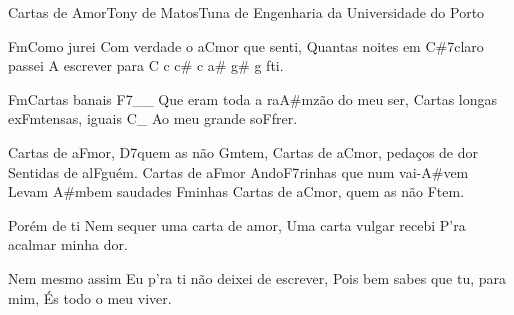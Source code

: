 \begin{musica}{Cartas de Amor}{Tony de Matos}{Tuna de Engenharia da Universidade do Porto}


\ac{Fm}{Co}mo jurei
Com verdade o a\ac{C}{mor} que senti,
Quantas noites em \ac{C#7}{cla}ro passei
A escrever para \ac{C c c# c a# g# g f}{ti}.

\ac{Fm}{Car}tas banais \ac{F7}{}__
Que eram toda a ra\ac{A#m}{zão} do meu ser,
Cartas longas ex\ac{Fm}{ten}sas, iguais
\ac{C}{}_ Ao meu grande so\ac{F}{frer}.

Cartas de a\ac{F}{mor}, \ac{D7}{quem} as não \ac{Gm}{tem},
Cartas de a\ac{C}{mor}, pedaços de dor
Sentidas de al\ac{F}{guém}.
Cartas de a\ac{F}{mor}
Ando\ac{F7}{ri}nhas que num vai-\ac{A#}{vem}
Levam \ac{A#m}{bem} saudades \ac{F}{mi}nhas
Cartas de a\ac{C}{mor}, quem as não \ac{F}{tem}.

Porém de ti
Nem sequer uma carta de amor,
Uma carta vulgar recebi
P’ra acalmar minha dor.

Nem mesmo assim
Eu p’ra ti não deixei de escrever,
Pois bem sabes que tu, para mim,
És todo o meu viver.

\end{musica}
